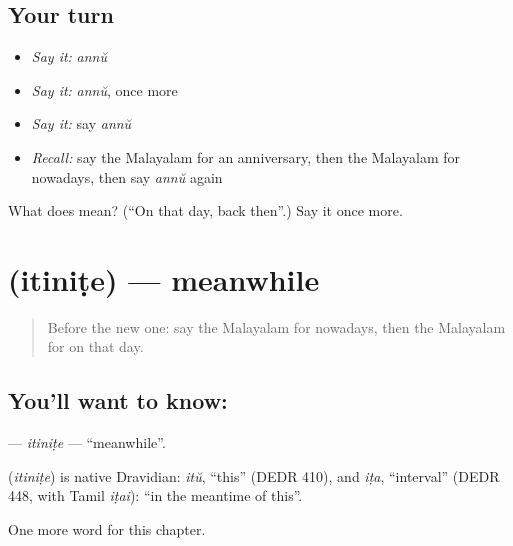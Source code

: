 \subsection*{Your turn}
\begin{itemize}
\raggedright
  \item \emph{Say it:} \emph{annŭ}
  \item \emph{Say it:} \emph{annŭ}, once more
  \item \emph{Say it:} say \emph{annŭ}
  \item \emph{Recall:} say the Malayalam for an anniversary, then the Malayalam for nowadays, then say \emph{annŭ} again
\end{itemize}

\begin{tcolorbox}[breakable,colback=teal!4,colframe=teal!35!black,title={Before you move on}]
What does  mean? (\textquotedblleft{}On that day, back then\textquotedblright{}.) Say it once more.
\end{tcolorbox}
\section[\texorpdfstring{\ml{ഇതിനിടെ} (itiniṭe)}{ഇതിനിടെ (itiniṭe)}]{ (itiniṭe) — meanwhile}

\label{lesson:ML-C277-itinite}



\begin{quote}
Before the new one: say the Malayalam for nowadays, then the Malayalam for on that day.
\end{quote}

\subsection*{You'll want to know: }
\textbf{} — \emph{itiniṭe} — \textquotedblleft{}meanwhile\textquotedblright{}.

\begin{cousinweb}
\textbf{} (\emph{itiniṭe}) is native Dravidian: \emph{itŭ}, \textquotedblleft{}this\textquotedblright{} (DEDR 410), and \emph{iṭa}, \textquotedblleft{}interval\textquotedblright{} (DEDR 448, with Tamil \emph{iṭai}): \textquotedblleft{}in the meantime of this\textquotedblright{}.
\end{cousinweb}

\begin{grammarlens}[title={What you've built}]
One more word for this chapter.
\end{grammarlens}

